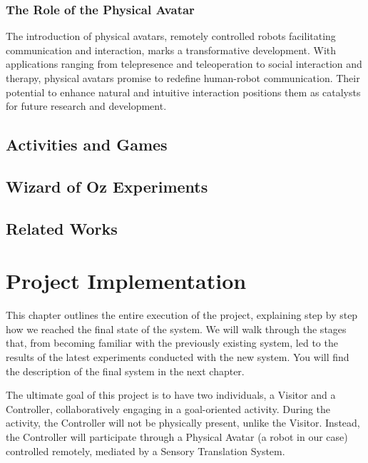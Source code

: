 \documentclass{Configuration_Files/PoliMi3i_thesis}
\begin{document}
\subsection{The Role of the Physical Avatar}
The introduction of physical avatars, remotely controlled robots facilitating communication and interaction, marks a transformative development. With applications ranging from telepresence and teleoperation to social interaction and therapy, physical avatars promise to redefine human-robot communication. Their potential to enhance natural and intuitive interaction positions them as catalysts for future research and development.

\section{Activities and Games}

\section{Wizard of Oz Experiments} %

\section{Related Works} %

\chapter{Project Implementation}


This chapter outlines the entire execution of the project, explaining step by step how we reached the final state of the system. We will walk through the stages that, from becoming familiar with the previously existing system, led to the results of the latest experiments conducted with the new system. You will find the description of the final system in the next chapter.

The ultimate goal of this project is to have two individuals, a Visitor and a Controller, collaboratively engaging in a goal-oriented activity. During the activity, the Controller will not be physically present, unlike the Visitor. Instead, the Controller will participate through a Physical Avatar (a robot in our case) controlled remotely, mediated by a Sensory Translation System.
\end{document}

